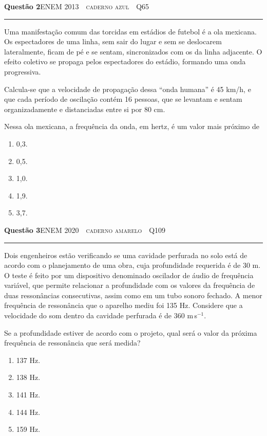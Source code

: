 \documentclass[11pt,a4paper]{article}
\newcommand{\fonte}[1]{{\small\scshape\color{grafite}#1}}
\newenvironment{questao}[2]{%
  \par\addvspace{1.6em}
  \needspace{12\baselineskip}
  {\large\bfseries\color{vinho}Quest\~ao #1}\hfill #2\\[-0.55em]
  {\color{black!25}\rule{\linewidth}{0.4pt}}
  \par\nobreak\smallskip
  \noindent\begin{minipage}{\linewidth}\setlength{\parskip}{0.45em}%
}{\end{minipage}\par\addvspace{0.4em}}
\begin{document}
\begin{questao}{2}{\fonte{ENEM 2013 \,\textperiodcentered\, caderno azul \,\textperiodcentered\, Q65}}
Uma manifesta\c{c}\~ao comum das torcidas em est\'adios de futebol \'e a ola
mexicana. Os espectadores de uma linha, sem sair do lugar e sem se
deslocarem lateralmente, ficam de p\'e e se sentam, sincronizados com os da
linha adjacente. O efeito coletivo se propaga pelos espectadores do
est\'adio, formando uma onda progressiva.

Calcula-se que a velocidade de propaga\c{c}\~ao dessa ``onda humana'' \'e
45 km/h, e que cada per\'iodo de oscila\c{c}\~ao cont\'em 16 pessoas, que se
levantam e sentam organizadamente e distanciadas entre si por 80 cm.

Nessa ola mexicana, a frequ\^encia da onda, em hertz, \'e um valor mais
pr\'oximo de
\begin{enumerate}
  \item 0,3.
  \item 0,5.
  \item 1,0.
  \item 1,9.
  \item 3,7.
\end{enumerate}
\end{questao}

\begin{questao}{3}{\fonte{ENEM 2020 \,\textperiodcentered\, caderno amarelo \,\textperiodcentered\, Q109}}
Dois engenheiros est\~ao verificando se uma cavidade perfurada no solo est\'a
de acordo com o planejamento de uma obra, cuja profundidade requerida \'e de
30 m. O teste \'e feito por um dispositivo denominado oscilador de \'audio de
frequ\^encia vari\'avel, que permite relacionar a profundidade com os valores
da frequ\^encia de duas resson\^ancias consecutivas, assim como em um tubo
sonoro fechado. A menor frequ\^encia de resson\^ancia que o aparelho mediu
foi 135 Hz. Considere que a velocidade do som dentro da cavidade perfurada
\'e de 360 m\,s$^{-1}$.

Se a profundidade estiver de acordo com o projeto, qual ser\'a o valor da
pr\'oxima frequ\^encia de resson\^ancia que ser\'a medida?
\begin{enumerate}
  \item 137 Hz.
  \item 138 Hz.
  \item 141 Hz.
  \item 144 Hz.
  \item 159 Hz.
\end{enumerate}
\end{questao}
\end{document}
